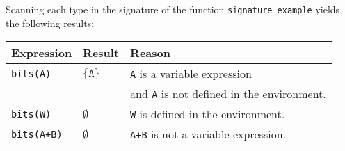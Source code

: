 Scanning each type in the signature
of the function \texttt{signature\_example} yields the following results:
\begin{center}
\begin{tabular}{lll}
\textbf{Expression} & \textbf{Result} & \textbf{Reason}\\
\hline
\texttt{bits(A)} & $\{\texttt{A}\}$ & \texttt{A} is a variable expression \\
& & and \texttt{A} is not defined in the environment.\\
\texttt{bits(W)} & $\emptyset$ & \texttt{W} is defined in the environment.\\
\texttt{bits(A+B)} & $\emptyset$ & \texttt{A+B} is not a variable expression.\\
\end{tabular}
\end{center}

